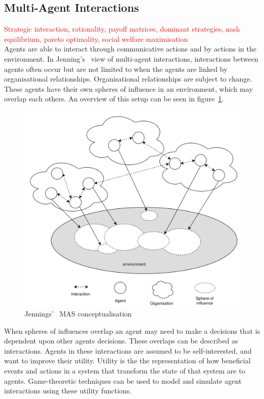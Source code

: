 \documentclass[]{final_report}
\begin{document}
\subsection{Multi-Agent Interactions}
\textcolor{red}{Strategic interaction, rationality, payoff matrices, dominant strategies, nash equilibrium, pareto optimality, social welfare maximisation}\\
Agents are able to interact through communicative actions and by actions in the environment. In Jenning's~\cite{jennings2000agent} view of multi-agent interactions, interactions between agents often occur but are not limited to when the agents are linked by organisational relationships. Organisational relationships are subject to change. These agents have their own spheres of influence in an environment, which may overlap each others. An overview of this setup can be seen in figure~\ref{fig:jenningsmas}.\par 
\begin{figure}
\vspace{-20pt}
\begin{framed}
\centering
	\includegraphics[width=\textwidth]{JenningsMAS.png}
	\caption{Jennings'~\cite{jennings2000agent} MAS conceptualisation}
	\label{fig:jenningsmas}
\end{framed}
\vspace{-30pt}
\end{figure}
When spheres of influences overlap an agent may need to make a decisions that is dependent upon other agents decisions. These overlaps can be described as interactions. Agents in these interactions are assumed to be self-interested, and want to improve their utility. Utility is the the representation of how beneficial events and actions in a system that transform the state of that system are to agents. Game-theoretic techniques can be used to model and simulate agent interactions using these utility functions. 
\end{document}
